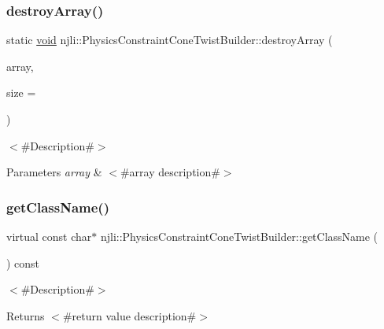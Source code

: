 \subsubsection{\texorpdfstring{destroy\+Array()}{destroyArray()}}
{\footnotesize\ttfamily static \mbox{\hyperlink{_thread_8h_af1e856da2e658414cb2456cb6f7ebc66}{void}} njli\+::\+Physics\+Constraint\+Cone\+Twist\+Builder\+::destroy\+Array (\begin{DoxyParamCaption}\item[{\mbox{\hyperlink{classnjli_1_1_physics_constraint_cone_twist_builder}{Physics\+Constraint\+Cone\+Twist\+Builder}} $\ast$$\ast$}]{array,  }\item[{const \mbox{\hyperlink{_util_8h_a10e94b422ef0c20dcdec20d31a1f5049}{u32}}}]{size = {} }\end{DoxyParamCaption})\hspace{0.3cm}{\ttfamily [static]}}

$<$\#\+Description\#$>$


\begin{DoxyParams}{Parameters}
{\em array} & $<$\#array description\#$>$ \\
\hline
\end{DoxyParams}
\mbox{\label{classnjli_1_1_physics_constraint_cone_twist_builder_a84baa66ab2cbe6bcecdd90a7a522f8ad}} 
\subsubsection{\texorpdfstring{get\+Class\+Name()}{getClassName()}}
{\footnotesize\ttfamily virtual const char$\ast$ njli\+::\+Physics\+Constraint\+Cone\+Twist\+Builder\+::get\+Class\+Name (\begin{DoxyParamCaption}{ }\end{DoxyParamCaption}) const\hspace{0.3cm}{\ttfamily [virtual]}}

$<$\#\+Description\#$>$

\begin{DoxyReturn}{Returns}
$<$\#return value description\#$>$ 
\end{DoxyReturn}


